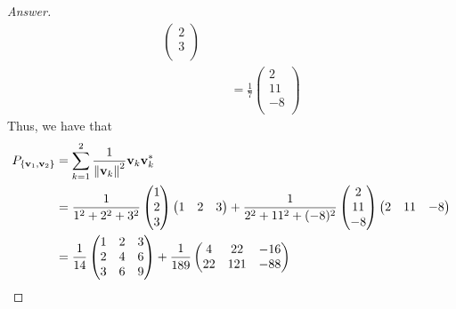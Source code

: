 \documentclass[../psets.tex]{subfiles}
\begin{document}
\begin{enumerate}[label={\textbf{3.\arabic*.}}]
\begin{proof}[Answer]
\begin{align*}
\begin{pmatrix}
                    2\\
                    3\\
                \end{pmatrix}\\
            &&
                &= \frac{1}{7}
                \begin{pmatrix}
                    2\\
                    11\\
                    -8\\
                \end{pmatrix}
        \end{align*}
        Thus, we have that
        \begin{align*}
            P_{\{\mathbf{v}_1,\mathbf{v}_2\}} &= \sum_{k=1}^2\frac{1}{\norm{\mathbf{v}_k}^2}\mathbf{v}_k\mathbf{v}_k^*\\
            &= \frac{1}{1^2+2^2+3^2}
            \begin{pmatrix}
                1\\
                2\\
                3\\
            \end{pmatrix}
            \begin{pmatrix}
                1 & 2 & 3\\
            \end{pmatrix}
            +\frac{1}{2^2+11^2+(-8)^2}
            \begin{pmatrix}
                2\\
                11\\
                -8\\
            \end{pmatrix}
            \begin{pmatrix}
                2 & 11 & -8
            \end{pmatrix}\\
            &= \frac{1}{14}
            \begin{pmatrix}
                1 & 2 & 3\\
                2 & 4 & 6\\
                3 & 6 & 9\\
            \end{pmatrix}
            +\frac{1}{189}
            \begin{pmatrix}
                4 & 22 & -16\\
                22 & 121 & -88\\

\end{pmatrix}
\end{align*}
\end{proof}
\end{enumerate}
\end{document}
